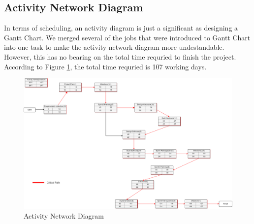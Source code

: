         \subsection{Activity Network Diagram}

            In terms of scheduling, an activity diagram is just a significant as designing a Gantt Chart. We merged
            several of the jobs that were introduced to Gantt Chart into one task to make the activity network diagram
            more undestandable. However, this has no bearing on the total time requried to finish the project. According
            to Figure \ref{fig:activity_network_diagram}, the total time requried is 107 working days.

            \begin{figure}[H] \includegraphics[width=\linewidth]{graphics/AND.drawio.png} \caption{Activity Network
            Diagram} \label{fig:activity_network_diagram} \end{figure}
